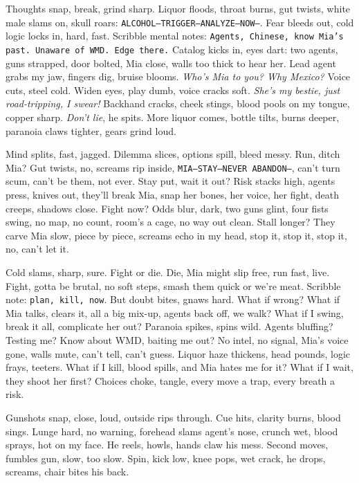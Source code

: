\documentclass[12pt,oneside]{book} %
\newcommand{\note}[1]{\texttt{#1}}
\begin{document}
Thoughts snap, break, grind sharp. Liquor floods, throat burns, gut twists, white male slams on, skull roars: \note{ALCOHOL—TRIGGER—ANALYZE—NOW—}. Fear bleeds out, cold logic locks in, hard, fast. Scribble mental notes: \note{Agents, Chinese, know Mia’s past. Unaware of WMD. Edge there.} Catalog kicks in, eyes dart: two agents, guns strapped, door bolted, Mia close, walls too thick to hear her. Lead agent grabs my jaw, fingers dig, bruise blooms. \textit{Who’s Mia to you? Why Mexico?} Voice cuts, steel cold. Widen eyes, play dumb, voice cracks soft. \textit{She’s my bestie, just road-tripping, I swear!} Backhand cracks, cheek stings, blood pools on my tongue, copper sharp. \textit{Don’t lie}, he spits. More liquor comes, bottle tilts, burns deeper, paranoia claws tighter, gears grind loud.

Mind splits, fast, jagged. Dilemma slices, options spill, bleed messy. Run, ditch Mia? Gut twists, no, screams rip inside, \note{MIA—STAY—NEVER ABANDON—}, can’t turn scum, can’t be them, not ever. Stay put, wait it out? Risk stacks high, agents press, knives out, they’ll break Mia, snap her bones, her voice, her fight, death creeps, shadows close. Fight now? Odds blur, dark, two guns glint, four fists swing, no map, no count, room’s a cage, no way out clean. Stall longer? They carve Mia slow, piece by piece, screams echo in my head, stop it, stop it, stop it, no, can’t let it.

Cold slams, sharp, sure. Fight or die. Die, Mia might slip free, run fast, live. Fight, gotta be brutal, no soft steps, smash them quick or we’re meat. Scribble note: \note{plan, kill, now}. But doubt bites, gnaws hard. What if wrong? What if Mia talks, clears it, all a big mix-up, agents back off, we walk? What if I swing, break it all, complicate her out? Paranoia spikes, spins wild. Agents bluffing? Testing me? Know about WMD, baiting me out? No intel, no signal, Mia’s voice gone, walls mute, can’t tell, can’t guess. Liquor haze thickens, head pounds, logic frays, teeters. What if I kill, blood spills, and Mia hates me for it? What if I wait, they shoot her first? Choices choke, tangle, every move a trap, every breath a risk.

Gunshots snap, close, loud, outside rips through. Cue hits, clarity burns, blood sings. Lunge hard, no warning, forehead slams agent’s nose, crunch wet, blood sprays, hot on my face. He reels, howls, hands claw his mess. Second moves, fumbles gun, slow, too slow. Spin, kick low, knee pops, wet crack, he drops, screams, chair bites his back. 
\end{document}
